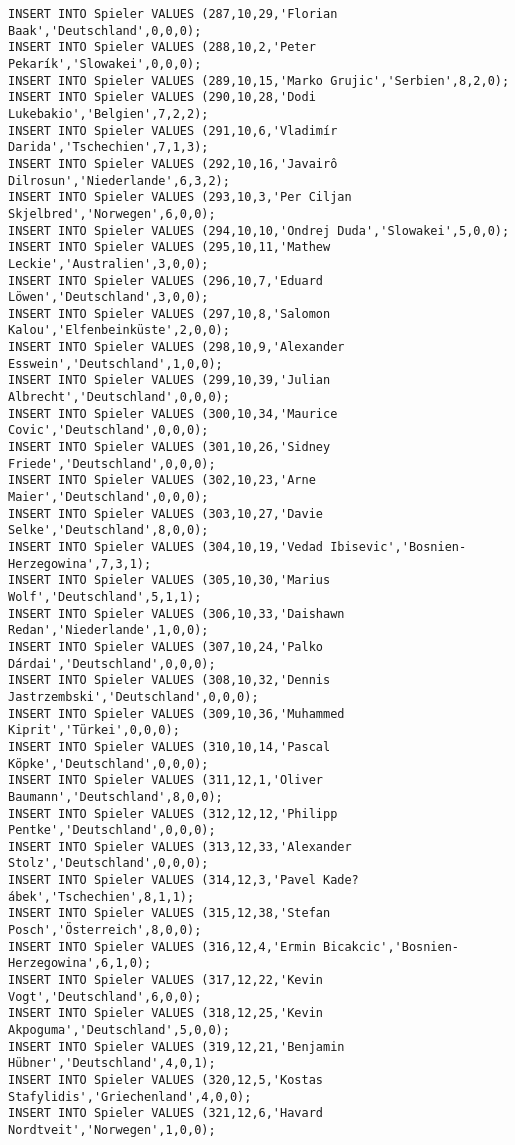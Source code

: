 \documentclass{bschlangaul-aufgabe}
\begin{document}
\begin{verbatim}
INSERT INTO Spieler VALUES (287,10,29,'Florian Baak','Deutschland',0,0,0);
INSERT INTO Spieler VALUES (288,10,2,'Peter Pekarík','Slowakei',0,0,0);
INSERT INTO Spieler VALUES (289,10,15,'Marko Grujic','Serbien',8,2,0);
INSERT INTO Spieler VALUES (290,10,28,'Dodi Lukebakio','Belgien',7,2,2);
INSERT INTO Spieler VALUES (291,10,6,'Vladimír Darida','Tschechien',7,1,3);
INSERT INTO Spieler VALUES (292,10,16,'Javairô Dilrosun','Niederlande',6,3,2);
INSERT INTO Spieler VALUES (293,10,3,'Per Ciljan Skjelbred','Norwegen',6,0,0);
INSERT INTO Spieler VALUES (294,10,10,'Ondrej Duda','Slowakei',5,0,0);
INSERT INTO Spieler VALUES (295,10,11,'Mathew Leckie','Australien',3,0,0);
INSERT INTO Spieler VALUES (296,10,7,'Eduard Löwen','Deutschland',3,0,0);
INSERT INTO Spieler VALUES (297,10,8,'Salomon Kalou','Elfenbeinküste',2,0,0);
INSERT INTO Spieler VALUES (298,10,9,'Alexander Esswein','Deutschland',1,0,0);
INSERT INTO Spieler VALUES (299,10,39,'Julian Albrecht','Deutschland',0,0,0);
INSERT INTO Spieler VALUES (300,10,34,'Maurice Covic','Deutschland',0,0,0);
INSERT INTO Spieler VALUES (301,10,26,'Sidney Friede','Deutschland',0,0,0);
INSERT INTO Spieler VALUES (302,10,23,'Arne Maier','Deutschland',0,0,0);
INSERT INTO Spieler VALUES (303,10,27,'Davie Selke','Deutschland',8,0,0);
INSERT INTO Spieler VALUES (304,10,19,'Vedad Ibisevic','Bosnien-Herzegowina',7,3,1);
INSERT INTO Spieler VALUES (305,10,30,'Marius Wolf','Deutschland',5,1,1);
INSERT INTO Spieler VALUES (306,10,33,'Daishawn Redan','Niederlande',1,0,0);
INSERT INTO Spieler VALUES (307,10,24,'Palko Dárdai','Deutschland',0,0,0);
INSERT INTO Spieler VALUES (308,10,32,'Dennis Jastrzembski','Deutschland',0,0,0);
INSERT INTO Spieler VALUES (309,10,36,'Muhammed Kiprit','Türkei',0,0,0);
INSERT INTO Spieler VALUES (310,10,14,'Pascal Köpke','Deutschland',0,0,0);
INSERT INTO Spieler VALUES (311,12,1,'Oliver Baumann','Deutschland',8,0,0);
INSERT INTO Spieler VALUES (312,12,12,'Philipp Pentke','Deutschland',0,0,0);
INSERT INTO Spieler VALUES (313,12,33,'Alexander Stolz','Deutschland',0,0,0);
INSERT INTO Spieler VALUES (314,12,3,'Pavel Kade?ábek','Tschechien',8,1,1);
INSERT INTO Spieler VALUES (315,12,38,'Stefan Posch','Österreich',8,0,0);
INSERT INTO Spieler VALUES (316,12,4,'Ermin Bicakcic','Bosnien-Herzegowina',6,1,0);
INSERT INTO Spieler VALUES (317,12,22,'Kevin Vogt','Deutschland',6,0,0);
INSERT INTO Spieler VALUES (318,12,25,'Kevin Akpoguma','Deutschland',5,0,0);
INSERT INTO Spieler VALUES (319,12,21,'Benjamin Hübner','Deutschland',4,0,1);
INSERT INTO Spieler VALUES (320,12,5,'Kostas Stafylidis','Griechenland',4,0,0);
INSERT INTO Spieler VALUES (321,12,6,'Havard Nordtveit','Norwegen',1,0,0);

\end{verbatim}
\end{document}
